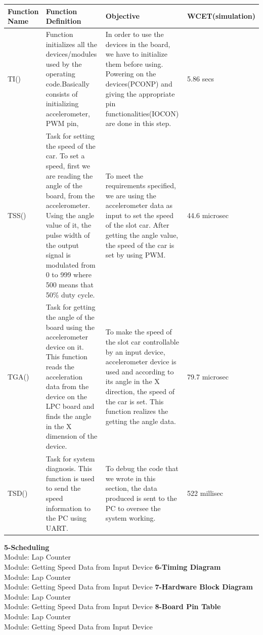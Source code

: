 \documentclass{article}
\begin{document}
\begin{tabular}{| C{4cm} | C{4cm} | C{4cm} | C{2cm} |}
\hline
\textbf{Function Name} &\textbf{Function Definition}  & \textbf{Objective} &\textbf{WCET}\linebreak(simulation)\\
\hline
TI()&Function initializes all the devices/modules used by the operating code.Basically consists of initializing
accelerometer, PWM pin, &In order to use the devices in the board, we have to initialize them before using.
Powering on the devices(PCONP) and giving the appropriate pin functionalities(IOCON) are done in this step.&5.86 secs\\
\hline
TSS()&Task for setting the speed of the car. To set a speed, first we are reading the angle of the board, from the
accelerometer. Using the angle value of it, the pulse width of the output signal is modulated from 0 to 999 where 500
means that 50\% duty cycle.& To meet the requirements specified, we are using the accelerometer data as input to
set the speed of the slot car. After getting the angle value, the speed of the car is set by using PWM.&44.6 microsec\\
\hline
TGA()&Task for getting the angle of the board using the accelerometer device on it. This function reads the
acceleration data from the device on the LPC board and finds the angle in the X dimension of the device.&
To make the speed of the slot car controllable by an input device, accelerometer device is used and according to
its angle in the X direction, the speed of the car is set. This function realizes the getting the angle data.&79.7 microsec\\
\hline
TSD()&Task for system diagnosis. This function is used to send the speed information to the PC using UART.&To debug the
code that we wrote in this section, the data produced is sent to the PC to oversee the system working.&522 millisec\\
\hline
\end{tabular}
\clearpage
{\huge\textbf {5-Scheduling}}
\\
{\huge {Module: Lap Counter}}
\\
{\huge {Module: Getting Speed Data from Input Device}}
\clearpage
{\huge\textbf {6-Timing Diagram}}
\\
{\huge {Module: Lap Counter}}
\\
{\huge {Module: Getting Speed Data from Input Device}}
\clearpage
{\huge\textbf {7-Hardware Block Diagram}}
\\
{\huge {Module: Lap Counter}}
\\
{\huge {Module: Getting Speed Data from Input Device}}
\clearpage
{\huge\textbf {8-Board Pin Table}}
\\
{\huge {Module: Lap Counter}}
\\
{\huge {Module: Getting Speed Data from Input Device}}
\\
\end{document}
